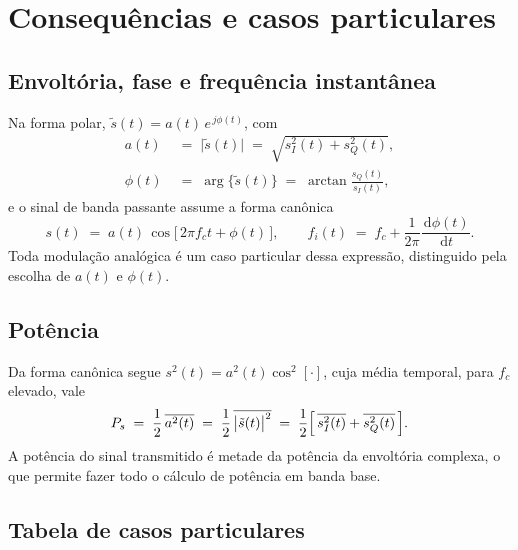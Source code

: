 \documentclass[11pt,a4paper]{article}
\newcommand{\dd}{\,\mathrm{d}}
\begin{document}
\section{Consequências e casos particulares}

\subsection{Envoltória, fase e frequência instantânea}

Na forma polar, $\tilde{s}(t) = a(t)\,e^{\,j\phi(t)}$, com
\begin{align}
  a(t) &\;=\; \bigl|\tilde{s}(t)\bigr| \;=\; \sqrt{s_I^{2}(t) + s_Q^{2}(t)},
  \label{eq:envoltoria_real}\\[0.4em]
  \phi(t) &\;=\; \arg\bigl\{\tilde{s}(t)\bigr\} \;=\; \arctan\frac{s_Q(t)}{s_I(t)},
  \label{eq:fase}
\end{align}
e o sinal de banda passante assume a forma canônica
\begin{equation}
  s(t) \;=\; a(t)\,\cos\bigl[\,2\pi f_c t + \phi(t)\,\bigr],
  \qquad
  f_i(t) \;=\; f_c + \frac{1}{2\pi}\frac{\dd\phi(t)}{\dd t}.
  \label{eq:forma_canonica}
\end{equation}
Toda modulação analógica é um caso particular dessa expressão, distinguido pela escolha de $a(t)$ e $\phi(t)$.

\subsection{Potência}

Da forma canônica segue $s^{2}(t) = a^{2}(t)\cos^{2}[\cdot]$, cuja média temporal, para $f_c$ elevado, vale
\begin{equation}
  P_s \;=\; \frac{1}{2}\,\overline{a^{2}(t)}
      \;=\; \frac{1}{2}\,\overline{\bigl|\tilde{s}(t)\bigr|^{2}}
      \;=\; \frac{1}{2}\Bigl[\,\overline{s_I^{2}(t)} + \overline{s_Q^{2}(t)}\,\Bigr].
  \label{eq:potencia_bb}
\end{equation}
A potência do sinal transmitido é metade da potência da envoltória complexa, o que permite fazer todo o cálculo de potência em banda base.

\subsection{Tabela de casos particulares}
\end{document}
